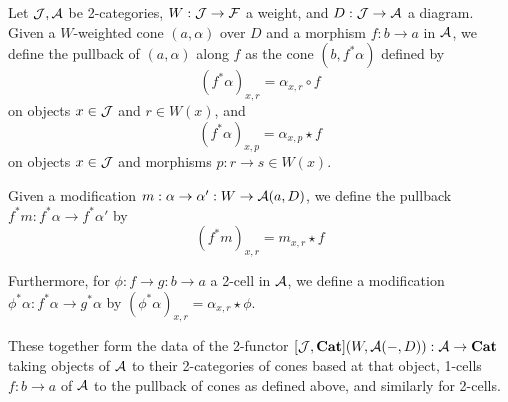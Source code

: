 \documentclass[../thesis.tex]{subfiles}
\begin{document}
\begin{definition}
  Let ${\mathcal{J}}, {\mathcal{A}}$ be 2-categories, $W : {\mathcal{J}} \to {\mathcal{F}}$ a weight, and $D : {\mathcal{J}} \to {\mathcal{A}}$ a diagram.
  Given a $W$-weighted cone $(a,\alpha)$ over $D$ and a morphism $f : b \to a$ in ${\mathcal{A}}$, we define
  the pullback of $(a,\alpha)$ along $f$ as the cone $(b,f^*\alpha)$ defined by
  \[(f^*\alpha)_{x,r} = \alpha_{x,r} \circ f\]
  on objects $x \in {\mathcal{J}}$ and $r \in W(x)$, and
  \[(f^*\alpha)_{x,p} = \alpha_{x,p} \star f\]
  on objects $x \in {\mathcal{J}}$ and morphisms $p : r \to s \in W(x)$.

  Given a modification $m : \alpha \to \alpha' : W \to {\mathcal{A}}(a,D)$, we define the pullback $f^*m : f^*\alpha
  \to f^*\alpha'$ by
  \[(f^*m)_{x,r} = m_{x,r} \star f\]


  Furthermore, for $\phi : f \to g : b \to a$ a 2-cell in ${\mathcal{A}}$, we define a modification $\phi^*\alpha :
  f^*\alpha \to g^*\alpha$ by \((\phi^*\alpha)_{x,r} = \alpha_{x,r} \star \phi\).

  These together form the data of the 2-functor $[{\mathcal{J}},{\mathbf{Cat}}](W,{\mathcal{A}}(-,D)) : {\mathcal{A}} \to {\mathbf{Cat}}$ taking objects of ${\mathcal{A}}$ to
  their 2-categories of cones based at that object, 1-cells $f : b \to a$ of ${\mathcal{A}}$ to the pullback of cones as defined
  above, and similarly for 2-cells.
\end{definition}
\end{document}
